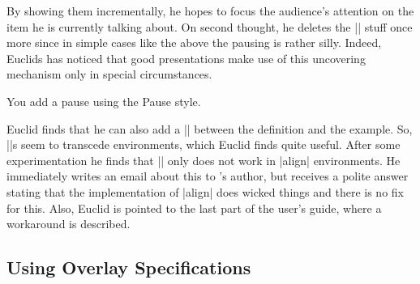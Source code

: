 By showing them incrementally, he
hopes to focus the audience's attention on the item he is currently
talking about. On second thought, he deletes the |\pause| stuff once
more since in simple cases like the above the pausing is rather
silly. Indeed, Euclids has noticed that good presentations make use of
this uncovering mechanism only in special circumstances.

\lyxnote
You add a pause using the Pause style.

Euclid finds that he can also add a |\pause| between the definition
and the example. So, |\pause|s seem to transcede environments, which
Euclid finds quite useful. After some experimentation he finds that
|\pause| only does not work in |align| environments. He immediately
writes an email about this to \beamer's author, but receives a polite
answer stating that the implementation of |align| does wicked things
and there is no fix for this. Also, Euclid is pointed to the last part
of the user's guide, where a workaround is described.


\subsection{Using Overlay Specifications}

